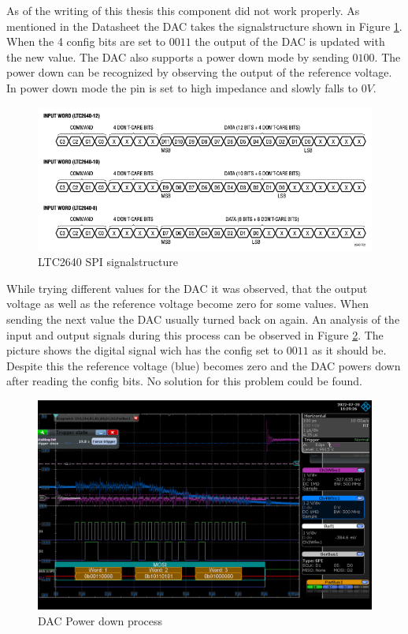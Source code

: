 As of the writing of this thesis this component did not work properly. As mentioned in the Datasheet the DAC takes the signalstructure shown in Figure \ref{fig:meas:circ:dac_spi}.\cite{noauthor_ltc2640_nodate} When the 4 config bits are set to $0011$ the output of the DAC is updated with the new value. The DAC also supports a power down mode by sending $0100$. The power down can be recognized by observing the output of the reference voltage. In power down mode the pin is set to high impedance and slowly falls to $0V$.
%
\begin{figure}
  \centering
  \includegraphics[width=\textwidth]{src/assets/pictures/measurements/dac_bit_structure.png}
  \caption{LTC2640 SPI signalstructure}\label{fig:meas:circ:dac_spi}
\end{figure}
\p
While trying different values for the DAC it was observed, that the output voltage as well as the reference voltage become zero for some values. When sending the next value the DAC usually turned back on again. An analysis of the input and output signals during this process can be observed in Figure \ref{fig:meas:circ:dac_power_down}.\p
The picture shows the digital signal wich has the config set to $0011$ as it should be. Despite this the reference voltage (blue) becomes zero and the DAC powers down after reading the config bits. No solution for this problem could be found.
%
\begin{figure}
  \centering
  \includegraphics[height=\largeheight]{src/assets/pictures/measurements/dac_power_down.png}
  \caption{DAC Power down process}\label{fig:meas:circ:dac_power_down}
\end{figure}